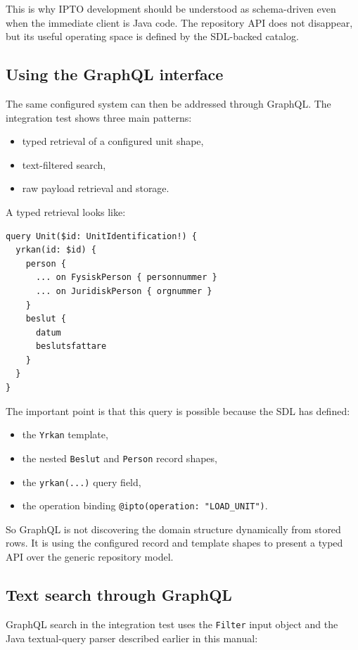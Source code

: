 This is why IPTO development should be understood as schema-driven even when the immediate client is Java code. The repository API does not disappear, but its useful operating space is defined by the SDL-backed catalog.

\subsection{Using the GraphQL interface}

The same configured system can then be addressed through GraphQL. The integration test shows three main patterns:
\begin{itemize}
\item typed retrieval of a configured unit shape,
\item text-filtered search,
\item raw payload retrieval and storage.
\end{itemize}

A typed retrieval looks like:

\begin{lstlisting}[style=GraphQL]
query Unit($id: UnitIdentification!) {
  yrkan(id: $id) {
    person {
      ... on FysiskPerson { personnummer }
      ... on JuridiskPerson { orgnummer }
    }
    beslut {
      datum
      beslutsfattare
    }
  }
}
\end{lstlisting}

The important point is that this query is possible because the SDL has defined:
\begin{itemize}
\item the \texttt{Yrkan} template,
\item the nested \texttt{Beslut} and \texttt{Person} record shapes,
\item the \texttt{yrkan(...)} query field,
\item the operation binding \texttt{@ipto(operation: "LOAD\_UNIT")}.
\end{itemize}

So GraphQL is not discovering the domain structure dynamically from stored rows. It is using the configured record and template shapes to present a typed API over the generic repository model.

\subsection{Text search through GraphQL}

GraphQL search in the integration test uses the \texttt{Filter} input object and the Java textual-query parser described earlier in this manual:

